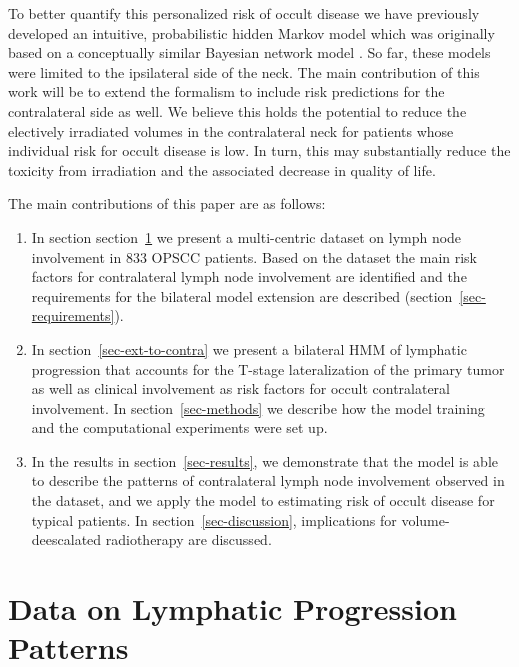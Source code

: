 \documentclass[
  sn-mathphys-num,
]{sn-jnl}
\begin{document}
To better quantify this personalized risk of occult disease we have
previously developed an intuitive, probabilistic hidden Markov model
\citep{ludwig_hidden_2021, ludwig_modelling_2023} which was originally
based on a conceptually similar Bayesian network model
\citep{pouymayou_bayesian_2019}. So far, these models were limited to
the ipsilateral side of the neck. The main contribution of this work
will be to extend the formalism to include risk predictions for the
contralateral side as well. We believe this holds the potential to
reduce the electively irradiated volumes in the contralateral neck for
patients whose individual risk for occult disease is low. In turn, this
may substantially reduce the toxicity from irradiation and the
associated decrease in quality of life.

The main contributions of this paper are as follows:

\begin{enumerate}
\def\labelenumi{\arabic{enumi}.}
\item
  In section section~\ref{sec-data} we present a multi-centric dataset
  on lymph node involvement in 833 OPSCC patients. Based on the dataset
  the main risk factors for contralateral lymph node involvement are
  identified and the requirements for the bilateral model extension are
  described (section~\ref{sec-requirements}).
\item
  In section~\ref{sec-ext-to-contra} we present a bilateral HMM of
  lymphatic progression that accounts for the T-stage lateralization of
  the primary tumor as well as clinical involvement as risk factors for
  occult contralateral involvement. In section~\ref{sec-methods} we
  describe how the model training and the computational experiments were
  set up.
\item
  In the results in section~\ref{sec-results}, we demonstrate that the
  model is able to describe the patterns of contralateral lymph node
  involvement observed in the dataset, and we apply the model to
  estimating risk of occult disease for typical patients. In
  section~\ref{sec-discussion}, implications for volume-deescalated
  radiotherapy are discussed.
\end{enumerate}

\section{Data on Lymphatic Progression Patterns}\label{sec-data}
\end{document}
